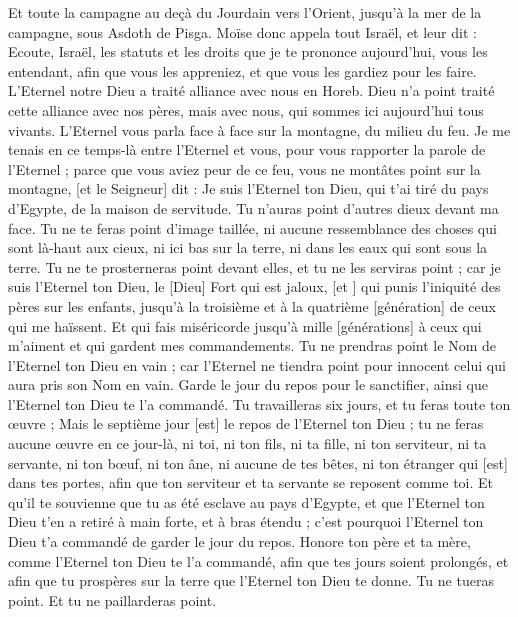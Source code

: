 \begin{multicols}{2}
Et toute la campagne au deçà du Jourdain vers l'Orient, jusqu'à la mer de la campagne, sous Asdoth de Pisga.
\VerseOne{}Moïse donc appela tout Israël, et leur dit : Ecoute, Israël, les statuts et les droits que je te prononce aujourd'hui, vous les entendant, afin que vous les appreniez, et que vous les gardiez pour les faire.
L'Eternel notre Dieu a traité alliance avec nous en Horeb.
Dieu n'a point traité cette alliance avec nos pères, mais avec nous, qui sommes ici aujourd'hui tous vivants.
L'Eternel vous parla face à face sur la montagne, du milieu du feu.
Je me tenais en ce temps-là entre l'Eternel et vous, pour vous rapporter la parole de l'Eternel ; parce que vous aviez peur de ce feu, vous ne montâtes point sur la montagne, [et le Seigneur] dit :
Je suis l'Eternel ton Dieu, qui t'ai tiré du pays d'Egypte, de la maison de servitude.
Tu n'auras point d'autres dieux devant ma face.
Tu ne te feras point d'image taillée, ni aucune ressemblance des choses qui sont là-haut aux cieux, ni ici bas sur la terre, ni dans les eaux qui sont sous la terre.
Tu ne te prosterneras point devant elles, et tu ne les serviras point ; car je suis l'Eternel ton Dieu, le [Dieu] Fort qui est jaloux, [et ] qui punis l'iniquité des pères sur les enfants, jusqu'à la troisième et à la quatrième [génération] de ceux qui me haïssent.
Et qui fais miséricorde jusqu'à mille [générations] à ceux qui m'aiment et qui gardent mes commandements.
Tu ne prendras point le Nom de l'Eternel ton Dieu en vain ; car l'Eternel ne tiendra point pour innocent celui qui aura pris son Nom en vain.
Garde le jour du repos pour le sanctifier, ainsi que l'Eternel ton Dieu te l'a commandé.
Tu travailleras six jours, et tu feras toute ton œuvre ;
Mais le septième jour [est] le repos de l'Eternel ton Dieu ; tu ne feras aucune œuvre en ce jour-là, ni toi, ni ton fils, ni ta fille, ni ton serviteur, ni ta servante, ni ton bœuf, ni ton âne, ni aucune de tes bêtes, ni ton étranger qui [est] dans tes portes, afin que ton serviteur et ta servante se reposent comme toi.
Et qu'il te souvienne que tu as été esclave au pays d'Egypte, et que l'Eternel ton Dieu t'en a retiré à main forte, et à bras étendu ; c'est pourquoi l'Eternel ton Dieu t'a commandé de garder le jour du repos.
Honore ton père et ta mère, comme l'Eternel ton Dieu te l'a commandé, afin que tes jours soient prolongés, et afin que tu prospères sur la terre que l'Eternel ton Dieu te donne.
Tu ne tueras point.
Et tu ne paillarderas point.

\end{multicols}
